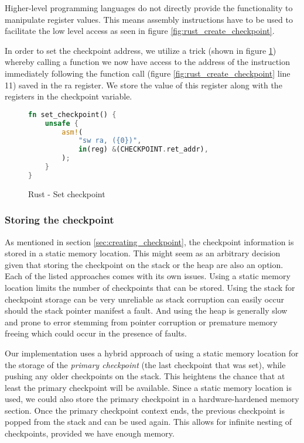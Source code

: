 Higher-level programming languages do not directly provide the functionality to manipulate register values. This means assembly instructions have to be used to facilitate the low level access as seen in figure \ref{fig:rust_create_checkpoint}.

In order to set the checkpoint address, we utilize a trick (shown in figure \ref{fig:rust_set_checkpoint}) whereby calling a function we now have access to the address of the instruction immediately following the function call (figure \ref{fig:rust_create_checkpoint} line 11) saved in the \acrshort{ra} register. We store the value of this register along with the registers in the checkpoint variable.

\begin{figure}[!h]
\begin{lstlisting}[language=Rust]
fn set_checkpoint() {
    unsafe {
        asm!(
            "sw ra, ({0})",
            in(reg) &(CHECKPOINT.ret_addr),
        );
    }
}
\end{lstlisting}
\caption{Rust - Set checkpoint}
\label{fig:rust_set_checkpoint}
\end{figure}

\subsubsection{Storing the checkpoint}

As mentioned in section \ref{sec:creating_checkpoint}, the checkpoint information is stored in a static memory location. This might seem as an arbitrary decision given that storing the checkpoint on the stack or the heap are also an option. Each of the listed approaches comes with its own issues. Using a static memory location limits the number of checkpoints that can be stored. Using the stack for checkpoint storage can be very unreliable as stack corruption can easily occur should the stack pointer manifest a fault. And using the heap is generally slow and prone to error stemming from pointer corruption or premature memory freeing which could occur in the presence of faults.

Our implementation uses a hybrid approach of using a static memory location for the storage of the \textit{primary checkpoint} (the last checkpoint that was set), while pushing any older checkpoints on the stack. This heightens the chance that at least the primary checkpoint will be available. Since a static memory location is used, we could also store the primary checkpoint in a hardware-hardened memory section. Once the primary checkpoint context ends, the previous checkpoint is popped from the stack and can be used again. This allows for infinite nesting of checkpoints, provided we have enough memory.

